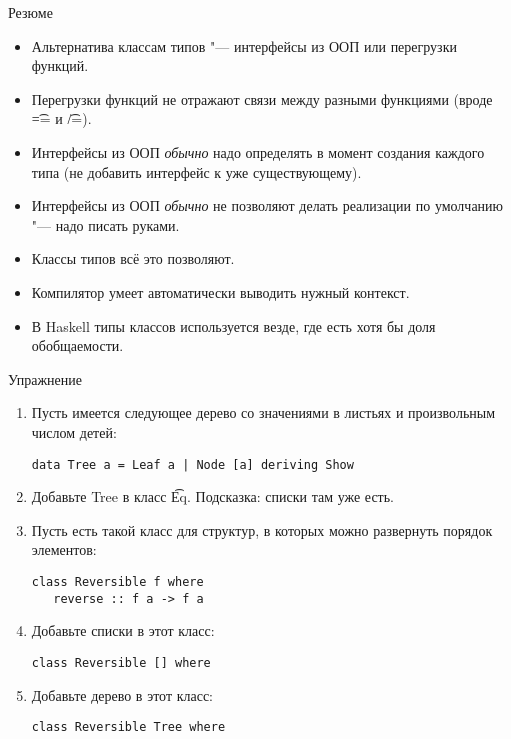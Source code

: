 \begin{frame}[fragile]{Резюме}
	\begin{itemize}
		\item Альтернатива классам типов "--- интерфейсы из ООП или перегрузки функций.
		\item Перегрузки функций не отражают связи между разными функциями (вроде \t{==} и \t{/=}).
		\item Интерфейсы из ООП \textit{обычно} надо определять в момент создания каждого типа (не добавить интерфейс к уже существующему).
		\item Интерфейсы из ООП \textit{обычно} не позволяют делать реализации по умолчанию "--- надо писать руками.
		\item Классы типов всё это позволяют.
		\item Компилятор умеет автоматически выводить нужный контекст.
		\item В Haskell типы классов используется везде, где есть хотя бы доля обобщаемости.
	\end{itemize}
\end{frame}

\begin{frame}[fragile]{Упражнение}
	\begin{enumerate}
		\item Пусть имеется следующее дерево со значениями в листьях и произвольным числом детей:
\begin{verbatim}
data Tree a = Leaf a | Node [a] deriving Show
\end{verbatim}
		\item Добавьте Tree в класс \t{Eq}. Подсказка: списки там уже есть.
		\item Пусть есть такой класс для структур, в которых можно развернуть порядок элементов:
\begin{verbatim}
class Reversible f where
   reverse :: f a -> f a
\end{verbatim}
		\item Добавьте списки в этот класс:
\begin{verbatim}
class Reversible [] where
\end{verbatim}
		\item Добавьте дерево в этот класс:
\begin{verbatim}
class Reversible Tree where
\end{verbatim}
	\end{enumerate}
\end{frame}
